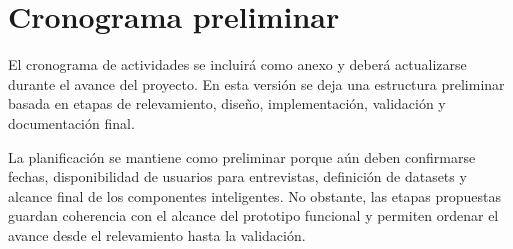 \section{Cronograma preliminar}

El cronograma de actividades se incluir\'a como anexo y deber\'a actualizarse durante el avance del proyecto. En esta versi\'on se deja una estructura preliminar basada en etapas de relevamiento, dise\~no, implementaci\'on, validaci\'on y documentaci\'on final.

La planificaci\'on se mantiene como preliminar porque a\'un deben confirmarse fechas, disponibilidad de usuarios para entrevistas, definici\'on de datasets y alcance final de los componentes inteligentes. No obstante, las etapas propuestas guardan coherencia con el alcance del prototipo funcional y permiten ordenar el avance desde el relevamiento hasta la validaci\'on.



\FloatBarrier
